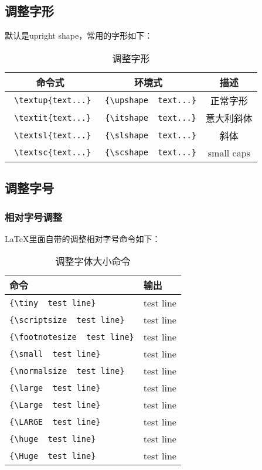 \documentclass[11pt,oneside]{book}
\begin{document}
  \subsection{调整字形}
  默认是upright shape，常用的字形如下：
  \begin{table}[H]
    \centering
    \label{tab:调整字形}
    \begin{tabular}{|c|c|c|}
      \hline
      命令式 & 环境式 & 描述 \\
      \hline
      \verb+ \textup{text...}+ & \verb+ {\upshape  text...}+  & 正常字形 \\
      \verb+ \textit{text...}+ & \verb+ {\itshape  text...}+  & 意大利斜体 \\
      \verb+ \textsl{text...}+ & \verb+ {\slshape  text...}+  & 斜体 \\
      \verb+ \textsc{text...}+ & \verb+ {\scshape  text...}+  & small caps \\
      \hline
    \end{tabular}
    \caption{调整字形}
  \end{table}


  \subsection{调整字号}

  \subsubsection{相对字号调整}
  \LaTeX 里面自带的调整相对字号命令如下：
  \begin{table}[H]
    \centering
    \label{tab:调整字体大小命令}
    \begin{tabular}{|l|l|}
      \hline
      命令 & 输出\\
      \hline
      \verb+{\tiny  test line}+ & {\tiny  test line}\\
      \verb+{\scriptsize  test line}+ & {\scriptsize  test line}\\
      \verb+{\footnotesize  test line}+ & {\footnotesize  test line}\\
      \verb+{\small  test line}+ & {\small test line}\\
      \verb+{\normalsize  test line}+ & {\normalsize  test line}\\
      \verb+{\large  test line}+ & {\large  test line}\\
      \verb+{\Large  test line}+ & {\Large  test line}\\
      \verb+{\LARGE  test line}+ & {\LARGE  test line}\\
      \verb+{\huge  test line}+ & {\huge  test line}\\
      \verb+{\Huge  test line}+ & {\Huge  test line}\\
      \hline
    \end{tabular}
    \caption{调整字体大小命令}
  \end{table}
\end{document}
